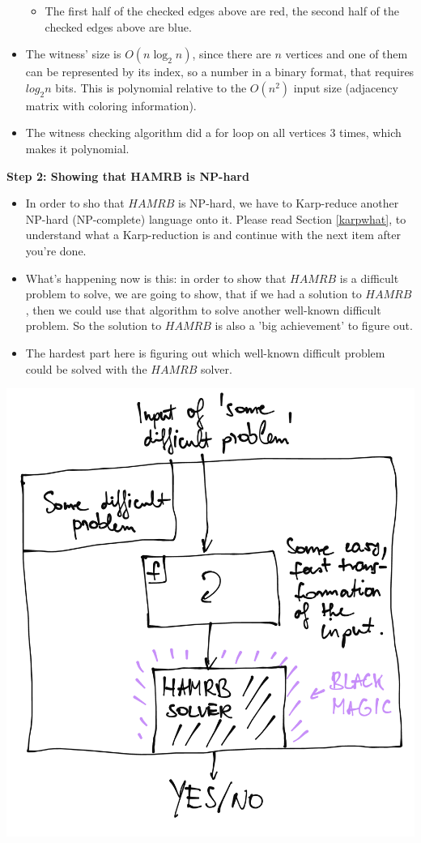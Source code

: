 \begin{itemize}
\begin{itemize}
        \item The first half of the checked edges above are red, the second half of the checked edges above are blue.
    \end{itemize}
    \item The witness' size is $O(n\log_{2}n)$, since there are $n$ vertices and one of them can be represented by its index, so a number in a binary format, that requires $log_{2}n$ bits. This is polynomial relative to the $O(n^2)$ input size (adjacency matrix with coloring information).
    \item The witness checking algorithm did a for loop on all vertices 3 times, which makes it polynomial.
\end{itemize}

\textbf{Step 2: Showing that HAMRB is NP-hard}

\begin{itemize}
    \item In order to sho that $HAMRB$ is NP-hard, we have to Karp-reduce another NP-hard (NP-complete) language onto it. Please read Section \ref{karpwhat},  to understand what a Karp-reduction is and continue with the next item after you're done.
    \item What's happening now is this: in order to show that $HAMRB$ is a difficult problem to solve, we are going to show, that if we had a solution to $HAMRB$, then we could use that algorithm to solve another well-known difficult problem. So the solution to $HAMRB$ is also a 'big achievement' to figure out.
    \item The hardest part here is figuring out which well-known difficult problem could be solved with the $HAMRB$ solver.
\end{itemize}

\begin{center}
\includegraphics[width=0.9\linewidth]{./exams/2022_05_30/03/hamrb_karp.png}
\end{center}

